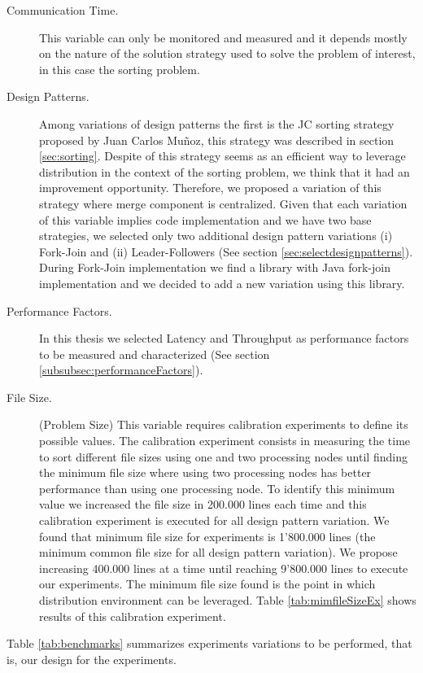 \begin{description}
	\item [Communication Time.] This variable can only be monitored and measured and it depends mostly on the nature of the solution strategy used to solve the problem of interest, in this case the sorting problem.
	\item [Design Patterns.] Among variations of design patterns the first is the JC sorting strategy proposed by Juan Carlos Mu\~{n}oz, this strategy was described in section \ref{sec:sorting}. Despite of this strategy seems as an efficient way to leverage distribution in the context of the sorting problem, we think that it had an improvement opportunity. Therefore, we proposed a variation of this strategy where merge component is centralized. Given that each variation of this variable implies code implementation and we have two base strategies, we selected only two additional design pattern variations (i) Fork-Join and (ii) Leader-Followers (See section \ref{sec:selectdesignpatterns}). \\
	During Fork-Join implementation we find a library with Java fork-join implementation \cite{lea2000javae} and we decided to add a new variation using this library.
	\item [Performance Factors.] In this thesis we selected Latency and Throughput as performance factors to be measured and characterized (See section \ref{subsubsec:performanceFactors}).
	\item [File Size.] (Problem Size) This variable requires calibration experiments to define its possible values. The calibration experiment consists in measuring the time to sort  different file sizes using one and two  processing nodes until finding the minimum file size where using two processing nodes has better performance than using one processing node. To identify this minimum value we increased the file size in 200.000 lines each time and this calibration experiment is executed for all design pattern variation. We found that minimum file size for experiments is 1'800.000 lines (the minimum common file size for all design pattern variation). We propose increasing 400.000 lines at a time until reaching 9'800.000 lines to execute our experiments. The minimum file size found is the point in which distribution environment can be leveraged. Table \ref{tab:mimfileSizeEx} shows results of this calibration experiment.
\end{description}

Table \ref{tab:benchmarks} summarizes experiments variations to be performed, that is, our design for the experiments.

